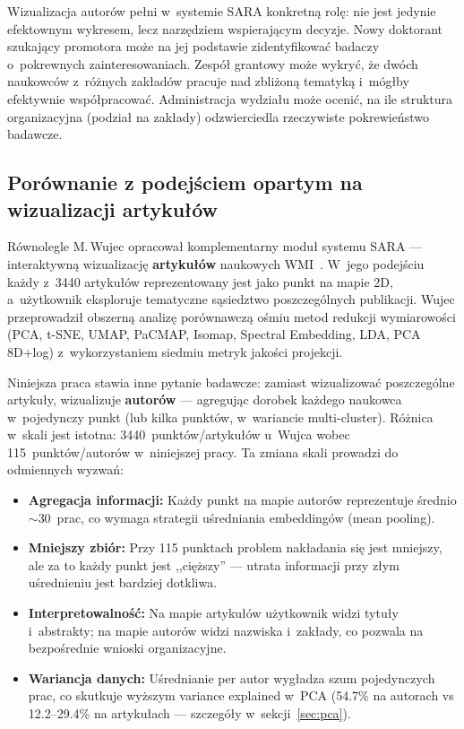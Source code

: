 \documentclass[a4paper,11pt]{article}
\begin{document}
Wizualizacja autorów pełni w~systemie SARA konkretną rolę: nie jest jedynie efektownym wykresem, lecz narzędziem wspierającym decyzje.
Nowy doktorant szukający promotora może na jej podstawie zidentyfikować badaczy o~pokrewnych zainteresowaniach.
Zespół grantowy może wykryć, że dwóch naukowców z~różnych zakładów pracuje nad zbliżoną tematyką i~mógłby efektywnie współpracować.
Administracja wydziału może ocenić, na ile struktura organizacyjna (podział na zakłady) odzwierciedla rzeczywiste pokrewieństwo badawcze.

\subsection{Porównanie z podejściem opartym na wizualizacji artykułów}

Równolegle M.\,Wujec opracował komplementarny moduł systemu SARA --- interaktywną wizualizację \textbf{artykułów} naukowych WMI~\cite{wujec2026}.
W~jego podejściu każdy z~3440 artykułów reprezentowany jest jako punkt na mapie 2D, a~użytkownik eksploruje tematyczne sąsiedztwo poszczególnych publikacji.
Wujec przeprowadził obszerną analizę porównawczą ośmiu metod redukcji wymiarowości (PCA, t-SNE, UMAP, PaCMAP, Isomap, Spectral Embedding, LDA, PCA\,8D+log) z~wykorzystaniem siedmiu metryk jakości projekcji.

Niniejsza praca stawia inne pytanie badawcze: zamiast wizualizować poszczególne artykuły, wizualizuje \textbf{autorów} --- agregując dorobek każdego naukowca w~pojedynczy punkt (lub kilka punktów, w~wariancie multi-cluster).
Różnica w~skali jest istotna: 3440~punktów/artykułów u~Wujca wobec 115~punktów/autorów w~niniejszej pracy.
Ta zmiana skali prowadzi do odmiennych wyzwań:

\begin{itemize}[nosep]
  \item \textbf{Agregacja informacji:} Każdy punkt na mapie autorów reprezentuje średnio $\sim$30~prac, co wymaga strategii uśredniania embeddingów (mean pooling).
  \item \textbf{Mniejszy zbiór:} Przy 115 punktach problem nakładania się jest mniejszy, ale za to każdy punkt jest ,,cięższy'' --- utrata informacji przy złym uśrednieniu jest bardziej dotkliwa.
  \item \textbf{Interpretowalność:} Na mapie artykułów użytkownik widzi tytuły i~abstrakty; na mapie autorów widzi nazwiska i~zakłady, co pozwala na bezpośrednie wnioski organizacyjne.
  \item \textbf{Wariancja danych:} Uśrednianie per autor wygładza szum pojedynczych prac, co skutkuje wyższym variance explained w~PCA (54.7\% na autorach vs 12.2--29.4\% na artykułach --- szczegóły w~sekcji~\ref{sec:pca}).
\end{itemize}
\end{document}
